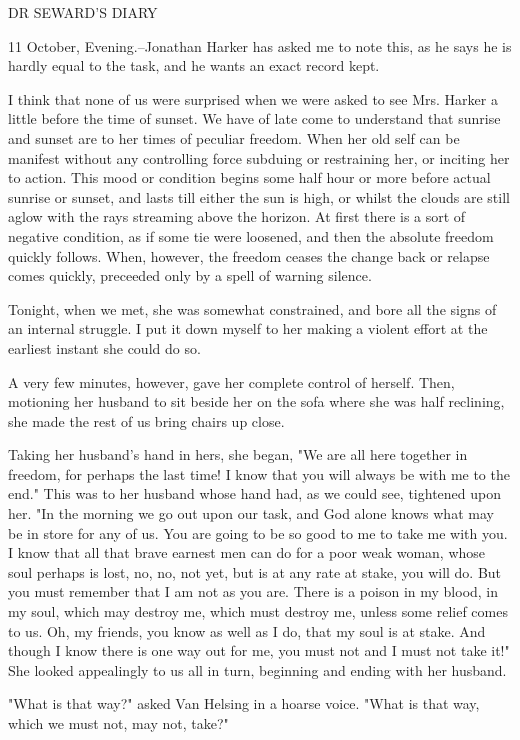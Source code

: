 DR SEWARD'S DIARY 

11 October, Evening.--Jonathan Harker has asked me to note this, as he says he is hardly equal to the task, and he wants an exact record kept. 

I think that none of us were surprised when we were asked to see Mrs. Harker a little before the time of sunset. We have of late come to understand that sunrise and sunset are to her times of peculiar freedom. When her old self can be manifest without any controlling force subduing or restraining her, or inciting her to action. This mood or condition begins some half hour or more before actual sunrise or sunset, and lasts till either the sun is high, or whilst the clouds are still aglow with the rays streaming above the horizon. At first there is a sort of negative condition, as if some tie were loosened, and then the absolute freedom quickly follows. When, however, the freedom ceases the change back or relapse comes quickly, preceeded only by a spell of warning silence. 

Tonight, when we met, she was somewhat constrained, and bore all the signs of an internal struggle. I put it down myself to her making a violent effort at the earliest instant she could do so. 

A very few minutes, however, gave her complete control of herself. Then, motioning her husband to sit beside her on the sofa where she was half reclining, she made the rest of us bring chairs up close. 

Taking her husband's hand in hers, she began, "We are all here together in freedom, for perhaps the last time! I know that you will always be with me to the end." This was to her husband whose hand had, as we could see, tightened upon her. "In the morning we go out upon our task, and God alone knows what may be in store for any of us. You are going to be so good to me to take me with you. I know that all that brave earnest men can do for a poor weak woman, whose soul perhaps is lost, no, no, not yet, but is at any rate at stake, you will do. But you must remember that I am not as you are. There is a poison in my blood, in my soul, which may destroy me, which must destroy me, unless some relief comes to us. Oh, my friends, you know as well as I do, that my soul is at stake. And though I know there is one way out for me, you must not and I must not take it!" She looked appealingly to us all in turn, beginning and ending with her husband. 

"What is that way?" asked Van Helsing in a hoarse voice. "What is that way, which we must not, may not, take?" 

